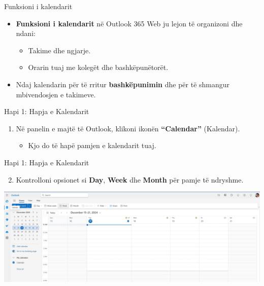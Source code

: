 \documentclass[
  ignorenonframetext,
]{beamer}
\providecommand{\tightlist}{%
  \setlength{\itemsep}{0pt}\setlength{\parskip}{0pt}}
\begin{document}
\begin{frame}{Funksioni i kalendarit}
\label{funksioni-i-kalendarit}
\begin{itemize}
\item
  \textbf{Funksioni i kalendarit} në Outlook 365 Web ju lejon të
  organizoni dhe ndani:

  \begin{itemize}
  \item
    Takime dhe ngjarje.
  \item
    Orarin tuaj me kolegët dhe bashkëpunëtorët.
  \end{itemize}
\item
  Ndaj kalendarin për të rritur \textbf{bashkëpunimin} dhe për të
  shmangur mbivendosjen e takimeve.
\end{itemize}
\end{frame}

\begin{frame}{Hapi 1: Hapja e Kalendarit}
\label{hapi-1-hapja-e-kalendarit}
\begin{enumerate}
\item
  Në panelin e majtë të Outlook, klikoni ikonën \textbf{``Calendar''}
  (Kalendar).

  \begin{itemize}
  \tightlist
  \item
    Kjo do të hapë pamjen e kalendarit tuaj.
  \end{itemize}
\end{enumerate}
\end{frame}

\begin{frame}{Hapi 1: Hapja e Kalendarit}
\label{hapi-1-hapja-e-kalendarit-1}
\begin{enumerate}
\setcounter{enumi}{1}
\tightlist
\item
  Kontrolloni opsionet si \textbf{Day}, \textbf{Week} dhe \textbf{Month}
  për pamje të ndryshme.
\end{enumerate}

\includegraphics{./images/outlook27.png}
\end{frame}
\end{document}
